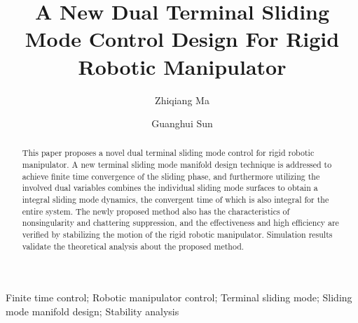 \documentclass[3p]{elsarticle}
\theoremstyle{plain}
\theoremstyle{remark}
\begin{document}
\begin{frontmatter}
\title{A New Dual Terminal Sliding Mode Control Design For Rigid Robotic Manipulator}
\author{Zhiqiang Ma}
\author{Guanghui Sun}
\address{Research Institute of Intelligent Control and Systems, Harbin Institute of Technology, Harbin 150001, China}

\begin{abstract}
This paper proposes a novel dual terminal sliding mode control for rigid robotic manipulator. A new terminal sliding mode manifold design technique is addressed to achieve finite time convergence of the sliding phase, and furthermore utilizing the involved dual variables combines the individual sliding mode surfaces to obtain a integral sliding mode dynamics, the convergent time of which is also integral for the entire system. The newly proposed method also has the characteristics of nonsingularity and chattering suppression, and the effectiveness and high efficiency are verified by stabilizing the motion of the rigid robotic manipulator. Simulation results validate the theoretical analysis about the proposed method. 
\end{abstract}
\begin{keyword}
Finite time control; Robotic manipulator control; Terminal sliding mode; Sliding mode manifold design; Stability analysis
\end{keyword}
\end{frontmatter}
\end{document}
